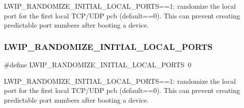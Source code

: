L\+W\+I\+P\+\_\+\+R\+A\+N\+D\+O\+M\+I\+Z\+E\+\_\+\+I\+N\+I\+T\+I\+A\+L\+\_\+\+L\+O\+C\+A\+L\+\_\+\+P\+O\+R\+TS==1\+: randomize the local port for the first local T\+C\+P/\+U\+DP pcb (default==0). This can prevent creating predictable port numbers after booting a device. \mbox{\label{group__lwip__opts__ipv4_gafd988b31749b30c65009c8ddf6c0a58d}} 
\subsubsection{\texorpdfstring{L\+W\+I\+P\+\_\+\+R\+A\+N\+D\+O\+M\+I\+Z\+E\+\_\+\+I\+N\+I\+T\+I\+A\+L\+\_\+\+L\+O\+C\+A\+L\+\_\+\+P\+O\+R\+TS}{LWIP\_RANDOMIZE\_INITIAL\_LOCAL\_PORTS}\hspace{0.1cm}{\footnotesize\ttfamily [2/2]}}
{\footnotesize\ttfamily \#define L\+W\+I\+P\+\_\+\+R\+A\+N\+D\+O\+M\+I\+Z\+E\+\_\+\+I\+N\+I\+T\+I\+A\+L\+\_\+\+L\+O\+C\+A\+L\+\_\+\+P\+O\+R\+TS~0}

L\+W\+I\+P\+\_\+\+R\+A\+N\+D\+O\+M\+I\+Z\+E\+\_\+\+I\+N\+I\+T\+I\+A\+L\+\_\+\+L\+O\+C\+A\+L\+\_\+\+P\+O\+R\+TS==1\+: randomize the local port for the first local T\+C\+P/\+U\+DP pcb (default==0). This can prevent creating predictable port numbers after booting a device. 